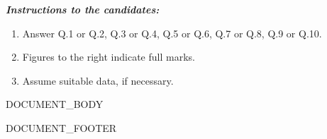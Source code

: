 \vspace{8pt}

\textbf{\textit{Instructions to the candidates:}}

\begin{enumerate}
\item Answer Q.1 or Q.2, Q.3 or Q.4, Q.5 or Q.6, Q.7 or Q.8, Q.9 or Q.10.
\item Figures to the right indicate full marks.
\item Assume suitable data, if necessary.
\end{enumerate}

\vspace{12pt}


{{DOCUMENT_BODY}}

\vspace{20pt}

{{DOCUMENT_FOOTER}}


